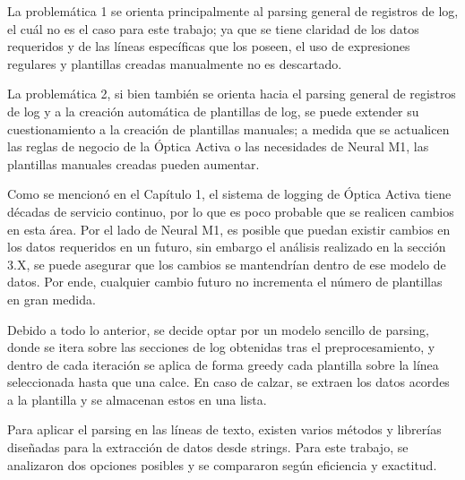 La problemática 1 se orienta principalmente al parsing general de registros de log, el cuál no es el caso para este trabajo; ya que se tiene claridad de los datos requeridos y de las líneas específicas que los poseen, el uso de expresiones regulares y plantillas creadas manualmente no es descartado.

La problemática 2, si bien también se orienta hacia el parsing general de registros de log y a la creación automática de plantillas de log, se puede extender su cuestionamiento a la creación de plantillas manuales; a medida que se actualicen las reglas de negocio de la Óptica Activa o las necesidades de Neural M1, las plantillas manuales creadas pueden aumentar.

Como se mencionó en el Capítulo 1, el sistema de logging de Óptica Activa tiene décadas de servicio continuo, por lo que es poco probable que se realicen cambios en esta área. Por el lado de Neural M1, es posible que puedan existir cambios en los datos requeridos en un futuro, sin embargo el análisis realizado en la sección 3.X, se puede asegurar que los cambios se mantendrían dentro de ese modelo de datos. Por ende, cualquier cambio futuro no incrementa el número de plantillas en gran medida.

Debido a todo lo anterior, se decide optar por un modelo sencillo de parsing, donde se itera sobre las secciones de log obtenidas tras el preprocesamiento, y dentro de cada iteración se aplica de forma greedy cada plantilla sobre la línea seleccionada hasta que una calce. En caso de calzar, se extraen los datos acordes a la plantilla y se almacenan estos en una lista.

Para aplicar el parsing en las líneas de texto, existen varios métodos y librerías diseñadas para la extracción de datos desde strings. Para este trabajo, se analizaron dos opciones posibles y se compararon según eficiencia y exactitud.

